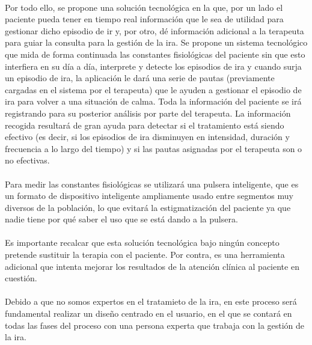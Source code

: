 \paragraph{}
Por todo ello, se propone una solución tecnológica en la que, por un lado el paciente pueda tener en tiempo real información que le sea de utilidad para gestionar dicho episodio de ir y, por otro, dé información adicional a la terapeuta para guiar la consulta para la gestión de la ira. Se propone un sistema tecnológico que mida de forma continuada las constantes fisiológicas del paciente sin que esto interfiera en su día a día, interprete y detecte los episodios de ira y cuando surja un episodio de ira, la aplicación le dará una serie de pautas (previamente cargadas en el sistema por el terapeuta) que le ayuden a gestionar el episodio de ira para volver a una situación de calma. Toda la información del paciente se irá registrando para su posterior análisis por parte del terapeuta. La información recogida resultará de gran ayuda para detectar si el tratamiento está siendo efectivo (es decir, si los episodios de ira disminuyen en intensidad, duración y frecuencia a lo largo del tiempo) y si las pautas asignadas por el terapeuta son o no efectivas.

\paragraph{}
Para medir las constantes fisiológicas se utilizará una pulsera inteligente, que es un formato de dispositivo inteligente ampliamente usado entre segmentos muy diversos de la población, lo que evitará la estigmatización del paciente ya que nadie tiene por qué saber el uso que se está dando a la pulsera.

\paragraph{}
Es importante recalcar que esta solución tecnológica bajo ningún concepto pretende sustituir la terapia con el paciente. Por contra, es una herramienta adicional que intenta mejorar los resultados de la atención clínica al paciente en cuestión.

\paragraph{}
Debido a que no somos expertos en el tratamieto de la ira, en este proceso será fundamental realizar un diseño centrado en el usuario, en el que se contará en todas las fases del proceso con una persona experta que trabaja con la gestión de la ira.

